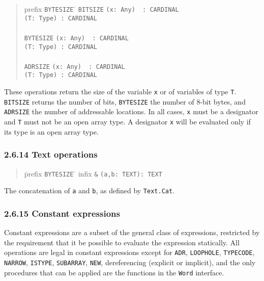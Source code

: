 \documentclass[10pt]{article}
\begin{document}
\begin{quote}
  \begin{tabbing}
    prefix \= \verb|BYTESIZE| \= \kill
    \> \verb|BITSIZE|  \> \verb|(x: Any)  : CARDINAL| \\
    \>                 \> \verb|(T: Type) : CARDINAL| \\
    \\
    \> \verb|BYTESIZE| \> \verb|(x: Any)  : CARDINAL| \\
    \>                 \> \verb|(T: Type) : CARDINAL| \\
    \\
    \> \verb|ADRSIZE|  \> \verb|(x: Any)  : CARDINAL| \\
    \>                 \> \verb|(T: Type) : CARDINAL|
  \end{tabbing}
\end{quote}
These operations return the size of the variable \verb|x| or of variables of
type \verb|T|.  \verb|BITSIZE| returns the number of bits, \verb|BYTESIZE| the
number of 8-bit bytes, and \verb|ADRSIZE| the number of addressable locations.
In all cases, \verb|x| must be a designator and \verb|T| must not be an open
array type.  A designator \verb|x| will be evaluated only if its type is an
open array type.

\subsubsection*{2.6.14 Text operations}

\begin{quote}
  \begin{tabbing}
    \=prefix \= \verb|BYTESIZE| \= \kill
    \>infix  \> \verb|&| \> \verb|(a,b: TEXT): TEXT|
  \end{tabbing}
\end{quote}
The concatenation of \verb|a| and \verb|b|, as defined by \verb|Text.Cat|.

\subsubsection*{2.6.15 Constant expressions}

Constant expressions are a subset of the general class of expressions,
restricted by the requirement that it be possible to evaluate the expression
statically.  All operations are legal in constant expressions except for
\verb|ADR|, \verb|LOOPHOLE|, \verb|TYPECODE|, \verb|NARROW|, \verb|ISTYPE|,
\verb|SUBARRAY|, \verb|NEW|, dereferencing (explicit or implicit), and the
only procedures that can be applied are the functions in the \verb|Word|
interface.
\end{document}
